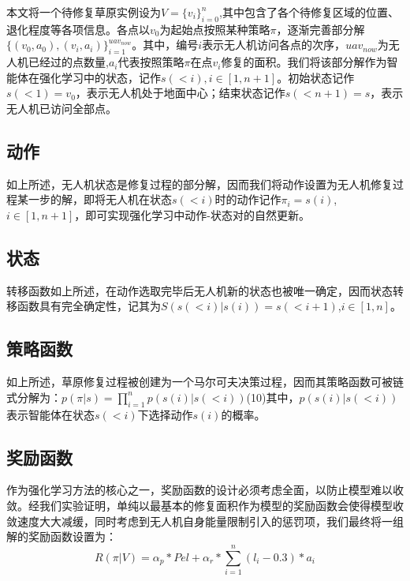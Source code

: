 \documentclass[AutoFakeBold]{LZUThesis}
\begin{document}
本文将一个待修复草原实例设为$V=\{v_i\}_{i=0}^n$,其中包含了各个待修复区域的位置、退化程度等各项信息。各点以$v_0$为起始点按照某种策略$\pi$，逐渐完善部分解$\{(v_0,a_0),(v_i,a_i)\}_{i=1}^{uav_{now}}$。其中，编号$i$表示无人机访问各点的次序，$uav_{now}$为无人机已经过的点数量,$a_i$代表按照策略$\pi$在点$v_i$修复的面积。我们将该部分解作为智能体在强化学习中的状态，记作$s(<i),i\in[1,n+1]$。初始状态记作$s(<1)=v_0$，表示无人机处于地面中心；结束状态记作$s(<n+1)=s$，表示无人机已访问全部点。

\subsection{动作}

如上所述，无人机状态是修复过程的部分解，因而我们将动作设置为无人机修复过程某一步的解，即将无人机在状态$s(<i)$时的动作记作$\pi_i=s(i)$,$i\in[1,n+1]$，即可实现强化学习中动作-状态对的自然更新。

\subsection{状态}

转移函数如上所述，在动作选取完毕后无人机新的状态也被唯一确定，因而状态转移函数具有完全确定性，记其为$S(s(<i)|s(i))=s(<i+1)$,$i\in[1,n]$。

\subsection{策略函数}

如上所述，草原修复过程被创建为一个马尔可夫决策过程，因而其策略函数可被链式分解为：$p(\pi|s)=\prod_{i=1}^n p(s(i)|s(<i))$(10)其中，$p(s(i)|s(<i))$表示智能体在状态$s(<i)$下选择动作$s(i)$的概率。

\subsection{奖励函数}

作为强化学习方法的核心之一，奖励函数的设计必须考虑全面，以防止模型难以收敛。经我们实验证明，单纯以最基本的修复面积作为模型的奖励函数会使得模型收敛速度大大减缓，同时考虑到无人机自身能量限制引入的惩罚项，我们最终将一组解的奖励函数设置为：
\begin{equation}
	R(\pi|V)=\alpha_{p}*Pel+\alpha_{r}*\sum_{i=1}^{n}(l_i-0.3)*a_{i}
	\label{eq:11}
\end{equation}
\end{document}

